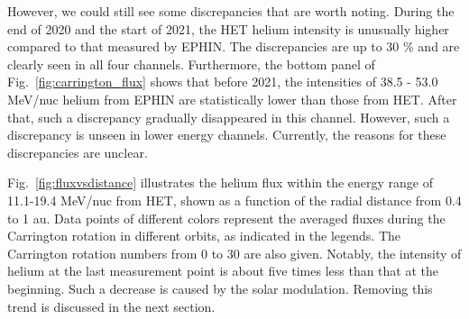 However, we could still see some discrepancies that are worth noting. During the end of 2020 and the start of 2021, the \ac{HET} helium intensity is unusually higher compared to that measured by \ac{EPHIN}. The discrepancies are up to 30 \% and are clearly seen in all four channels. Furthermore, the bottom panel of Fig.~\ref{fig:carrington_flux} shows that before 2021, the intensities of 38.5 - 53.0 MeV/nuc helium from \ac{EPHIN} are statistically lower than those from \ac{HET}. After that, such a discrepancy gradually disappeared in this channel. However, such a discrepancy is unseen in lower energy channels. Currently, the reasons for these discrepancies are unclear.

Fig.~\ref{fig:fluxvsdistance} illustrates the helium flux within the energy range of 11.1-19.4 MeV/nuc from \ac{HET}, shown as a function of the radial distance from 0.4 to 1 au. Data points of different colors represent the averaged fluxes during the Carrington rotation in different orbits, as indicated in the legends. The Carrington rotation numbers from 0 to 30 are also given. Notably, the intensity of helium at the last measurement point is about five times less than that at the beginning. Such a decrease is caused by the solar modulation. Removing this trend is discussed in the next section.




